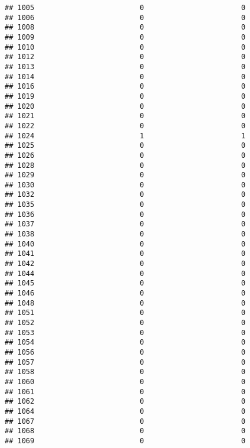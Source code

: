 \documentclass[
]{article}
\begin{document}
\begin{verbatim}
## 1005                         0                       0
## 1006                         0                       0
## 1008                         0                       0
## 1009                         0                       0
## 1010                         0                       0
## 1012                         0                       0
## 1013                         0                       0
## 1014                         0                       0
## 1016                         0                       0
## 1019                         0                       0
## 1020                         0                       0
## 1021                         0                       0
## 1022                         0                       0
## 1024                         1                       1
## 1025                         0                       0
## 1026                         0                       0
## 1028                         0                       0
## 1029                         0                       0
## 1030                         0                       0
## 1032                         0                       0
## 1035                         0                       0
## 1036                         0                       0
## 1037                         0                       0
## 1038                         0                       0
## 1040                         0                       0
## 1041                         0                       0
## 1042                         0                       0
## 1044                         0                       0
## 1045                         0                       0
## 1046                         0                       0
## 1048                         0                       0
## 1051                         0                       0
## 1052                         0                       0
## 1053                         0                       0
## 1054                         0                       0
## 1056                         0                       0
## 1057                         0                       0
## 1058                         0                       0
## 1060                         0                       0
## 1061                         0                       0
## 1062                         0                       0
## 1064                         0                       0
## 1067                         0                       0
## 1068                         0                       0
## 1069                         0                       0

\end{verbatim}
\end{document}
